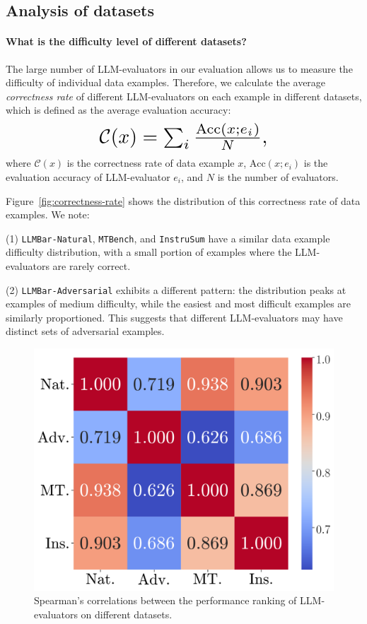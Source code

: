 \documentclass[11pt]{article}
\newcommand{\llmbarnatural}{\texttt{LLMBar-Natural}\xspace}
\newcommand{\adversarial}{\texttt{LLMBar-Adversarial}\xspace}
\newcommand{\mtbench}{\texttt{MTBench}\xspace}
\newcommand{\instrusum}{\texttt{InstruSum}\xspace}
\begin{document}
\subsection{Analysis of datasets}
\label{subsec:analysis-dataset}


\paragraph{What is the difficulty level of different datasets?}

The large number of LLM-evaluators in our evaluation allows us to measure the difficulty of individual data examples. Therefore, we calculate the average \textit{correctness rate} of different LLM-evaluators on each example in different datasets, which is defined as the average evaluation accuracy:
\begin{equation}
\label{eq:correctness}
\resizebox{0.5\hsize}{!}{$
 \mathcal{C}(x) = \sum_{i}\frac{\mathrm{Acc}(x;e_i)}{N},
$}
\end{equation}
where $\mathcal{C}(x)$ is the correctness rate of data example $x$, $\mathrm{Acc}(x;e_i)$ is the evaluation accuracy of LLM-evaluator $e_i$, and $N$ is the number of evaluators.
 
Figure~\ref{fig:correctness-rate} shows the distribution of this correctness rate of data examples.
% 
We note:

\noindent (1) \llmbarnatural, \mtbench, and \instrusum have a similar data example difficulty distribution, with a small portion of examples where the LLM-evaluators are rarely correct.



\noindent (2) \adversarial exhibits a different pattern: the distribution peaks at examples of medium difficulty, while the easiest and most difficult examples are similarly proportioned. 
This suggests that different LLM-evaluators may have distinct sets of adversarial examples.

\begin{figure}[t!]
    \centering
    \includegraphics[width=0.6\linewidth]{figures/final_v2_dataset_similarity.pdf}
 \caption{\label{fig:dataset-corr} Spearman's correlations between the performance ranking of LLM-evaluators on different datasets.
    }
\end{figure}
\end{document}
